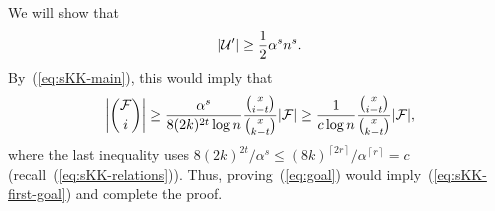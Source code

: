 \documentclass[11pt]{article}
\makeatletter
\renewenvironment{proof}[1][\proofname]
{\par\pushQED{\qed}
	\normalfont\topsep6\p@\@plus6\p@\relax\trivlist
	\item[\hskip\labelsep\bfseries#1\@addpunct{.}]
	\ignorespaces}
{\popQED\endtrivlist\@endpefalse}
\newcommand{\FF}{{\cal F}}
\newcommand{\UU}{{\cal U}}
\newcommand{\ceil}[1]{\left\lceil #1 \right\rceil}
\renewcommand{\a}{\alpha}
\newcommand{\N}{\mathbb{N}}
\makeatother
\begin{document}
\begin{proof}[Proof of Theorem~\ref{th:skk}]
	We will show that
	\begin{equation}\label{eq:goal}
	|\UU'| \ge \frac12 \a^s n^s .
	\end{equation}
%	
%	
%	
	By~(\ref{eq:sKK-main}), this would imply that
	$$\bigg|\binom{\FF}{i}\bigg| \ge \frac{\a^s}{8(2k)^{2t}\log n} \frac{\binom{x}{i-t}}{\binom{x}{k-t}} |\FF|
	\ge \frac{1}{c\log n}\frac{\binom{x}{i-t}}{\binom{x}{k-t}} |\FF| ,$$
	where the last inequality uses $8(2k)^{2t}/\a^s \le (8k)^{\ceil{2r}}/\a^{\ceil{r}} = c$
	(recall~(\ref{eq:sKK-relations})).
	Thus, proving~(\ref{eq:goal}) would imply~(\ref{eq:sKK-first-goal}) and complete the proof.
	
	

\end{proof}
\end{document}
